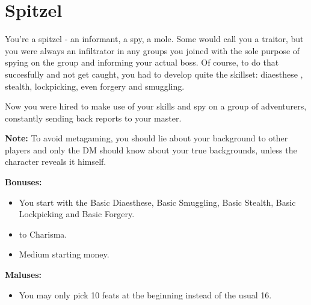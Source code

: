 \section{Spitzel}
You're a spitzel - an informant, a spy, a mole. Some would call you a traitor, but you were always an infiltrator in any groups you joined with the sole purpose of spying on the group and informing your actual boss. Of course, to do that succesfully and not get caught, you had to develop quite the skillset: diaesthese , stealth, lockpicking, even forgery and smuggling.

Now you were hired to make use of your skills and spy on a group of adventurers, constantly sending back reports to your master.

\textbf{Note:} To avoid metagaming, you should lie about your background to other players and only the DM should know about your true backgrounds, unless the character reveals it himself.

\textbf{Bonuses:}
\begin{itemize}
	\item You start with the Basic Diaesthese, Basic Smuggling, Basic Stealth, Basic Lockpicking and Basic Forgery.
	\item {} to Charisma.
	\item Medium starting money.
\end{itemize}


\textbf{Maluses:}
\begin{itemize}
	\item You may only pick 10 feats at the beginning instead of the usual 16.
\end{itemize}
